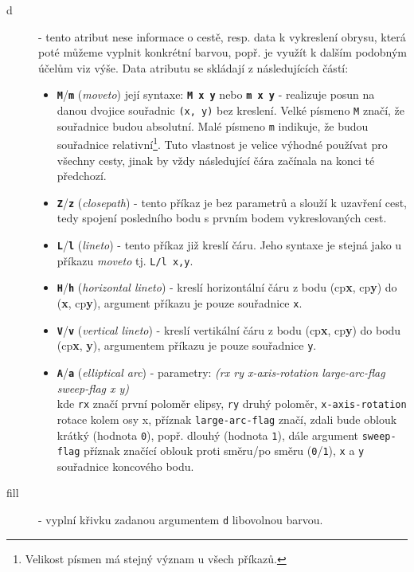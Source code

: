 \begin{description}
	\item[d]  - tento atribut nese informace o cestě, resp. data k vykreslení obrysu, která poté můžeme vyplnit konkrétní barvou, popř. je využít k dalším podobným účelům viz výše. Data atributu se skládají z následujících částí:
	
	\begin{itemize}
		\item \texttt{\textbf{M}}/\texttt{\textbf{m}} (\textit{moveto}) její syntaxe: \texttt{\textbf{M x y}} nebo \texttt{\textbf{m x y}} - realizuje posun na danou dvojice souřadnic \texttt{(x, y)} bez kreslení. Velké písmeno \texttt{M} značí, že souřadnice budou absolutní. Malé písmeno \texttt{m} indikuje, že budou souřadnice relativní\footnote{Velikost písmen má stejný význam u všech příkazů.}. Tuto vlastnost je velice výhodné používat pro všechny cesty, jinak by vždy následující čára začínala na konci té předchozí.\\
		
		\item \texttt{\textbf{Z}}/\texttt{\textbf{z}} (\textit{closepath}) - tento příkaz je bez parametrů a slouží k uzavření cest, tedy spojení posledního bodu s prvním bodem vykreslovaných cest.\\
		
		\item \texttt{\textbf{L}}/\texttt{\textbf{l}} (\textit{lineto}) - tento příkaz již kreslí čáru. Jeho syntaxe je  stejná jako u příkazu \textit{moveto} tj. \texttt{L/l x,y}.\\
		
		\item \texttt{\textbf{H}}/\texttt{\textbf{h}} (\textit{horizontal lineto}) - kreslí horizontální čáru z bodu (cp\textbf{x}, cp\textbf{y}) do (\textbf{x}, cp\textbf{y}), argument příkazu je pouze souřadnice \texttt{x}.\\
		
		\item \texttt{\textbf{V}}/\texttt{\textbf{v}} (\textit{vertical lineto}) - kreslí vertikální čáru z bodu (cp\textbf{x}, cp\textbf{y}) do bodu (cp\textbf{x}, \textbf{y}), argumentem příkazu je pouze souřadnice \texttt{y}.\\
		
		\item \texttt{\textbf{A}}/\texttt{\textbf{a}} (\textit{elliptical arc}) - parametry:  \textit{{\small (rx ry x-axis-rotation large-arc-flag sweep-flag x y)}} \\ kde \texttt{rx} značí první poloměr elipsy, \texttt{ry} druhý poloměr, \texttt{x-axis-rotation} rotace kolem osy x, příznak \texttt{large-arc-flag} značí, zdali bude oblouk krátký (hodnota \texttt{0}), popř. dlouhý (hodnota \texttt{1}), dále argument \texttt{sweep-flag} příznak značící oblouk proti směru/po směru (\texttt{0}/\texttt{1}), \texttt{x} a \texttt{y} souřadnice koncového bodu. \cite{svg}
	\end{itemize}


	\item[fill]  - vyplní křivku zadanou argumentem \texttt{d} libovolnou barvou.
\end{description}




